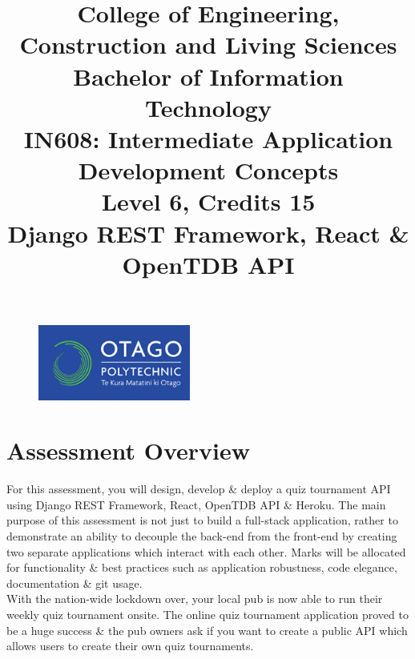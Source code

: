 \documentclass{article}
\author{}
\begin{document}
\begin{figure}
	\centering
	\includegraphics[width=50mm]{./img/logo.png}
\end{figure}

\title{College of Engineering, Construction and Living Sciences\\Bachelor of Information Technology\\IN608: Intermediate Application Development Concepts\\Level 6, Credits 15\\\textbf{Django REST Framework, React \& OpenTDB API}}
\date{}
\maketitle

\section*{Assessment Overview} 
For this assessment, you will design, develop \& deploy a quiz tournament API using Django REST Framework, React, OpenTDB API \& Heroku. The main purpose of this assessment is not just to build a full-stack application, rather to demonstrate an ability to decouple the back-end from the front-end by creating two separate applications which interact with each other. Marks will be allocated for functionality \& best practices such as application robustness, code elegance, documentation \& git usage. \\

With the nation-wide lockdown over, your local pub is now able to run their weekly quiz tournament onsite. The online quiz tournament application proved to be a huge success \& the pub owners ask if you want to create a public API which allows users to create their own quiz tournaments.
\end{document}
